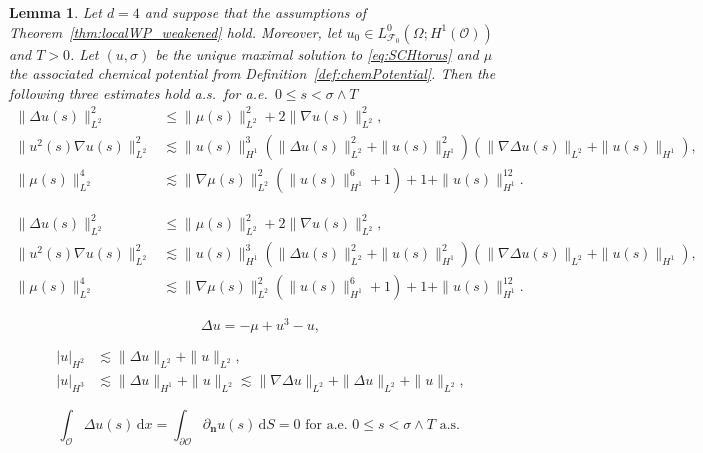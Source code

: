 \documentclass[10pt,a4paper]{amsart}
\newtheorem{lemma}{Lemma}
\newcommand{\F}{\mathscr{F}}
\newcommand{\dx}{\,\mathrm{d}x}
\newcommand{\grad}{\nabla}
\newcommand{\rmd}{\mathrm{d}}
\newcommand{\sO}{\mathscr{O}}
\begin{document}
\begin{lemma} \label{lem:globalWP_d4_claims}
	Let $d=4$ and suppose that the assumptions of Theorem~\ref{thm:localWP_weakened} hold. Moreover, let $u_0\in L^0_{\F_0}(\Omega;H^1(\sO))$ and $T>0$. Let $(u,\sigma)$ be the unique maximal solution to \eqref{eq:SCHtorus} and $\mu$ the associated chemical potential from Definition~\ref{def:chemPotential}. Then the following three estimates hold a.s.\ for a.e.\ $0\le s <\sigma \land T$
    \begin{align}
        \|\Delta u(s)\|_{L^2}^2  & \le \|\mu(s)\|_{L^2}^2 + 2\| \grad u(s)\|_{L^2}^2 \label{eq:globalWP_d4_eq1}, \\
         \|u^2(s)\nabla u(s)\|_{L^2}^2 & \lesssim
        \|u(s)\|^3_{H^1}
        \left(\|\Delta u(s)\|_{L^2}^2
        +\|u(s)\|^2_{H^1}  \right)
        \left( \|\grad \Delta u(s)\|_{L^2}
        +\|u(s)\|_{H^1}\right),
        \label{eq:globalWP_d4_eq2} \\
        \|\mu(s)\|_{L^2}^4 & \lesssim \|\nabla\mu(s)\|_{L^2}^2 \left(\|u(s)\|_{H^1}^6 + 1\right) + 1
        + \|u(s)\|_{H^1}^{12}. \label{eq:globalWP_d4_eq3}
    \end{align}
\end{lemma}

    \begin{align}
        \|\Delta u(s)\|_{L^2}^2  & \le \|\mu(s)\|_{L^2}^2 + 2\| \grad u(s)\|_{L^2}^2 , \\
         \|u^2(s)\nabla u(s)\|_{L^2}^2 & \lesssim
        \|u(s)\|^3_{H^1}
        \left(\|\Delta u(s)\|_{L^2}^2
        +\|u(s)\|^2_{H^1}  \right)
        \left( \|\grad \Delta u(s)\|_{L^2}
        +\|u(s)\|_{H^1}\right),
         \\
        \|\mu(s)\|_{L^2}^4 & \lesssim \|\nabla\mu(s)\|_{L^2}^2 \left(\|u(s)\|_{H^1}^6 + 1\right) + 1
        + \|u(s)\|_{H^1}^{12}. 
    \end{align}

\begin{equation}\label{eq:muRearranged}
\Delta u = -\mu + u^3 - u,
\end{equation}

\begin{align} \label{eq:ellReg_H2_seminorm}
    |u|_{H^2} &\lesssim \|\Delta u\|_{L^2}+\|u\|_{L^2},\\
    |u|_{H^3} &\lesssim \|\Delta u\|_{H^1}+\|u\|_{L^2} \lesssim \|\grad \Delta u\|_{L^2}+\|\Delta u\|_{L^2}+\|u\|_{L^2},\nonumber
\end{align}

\begin{equation}
\label{eq:proofDivergenceThm}
    \int_{\sO} \Delta u(s) \dx=\int_{\partial\sO} \partial_{\mathbf{n}}u(s) \,\rmd S=0\text{ for a.e.\ }0 \le s <\sigma \land T \text{ a.s.\ }
\end{equation}
\end{document}
